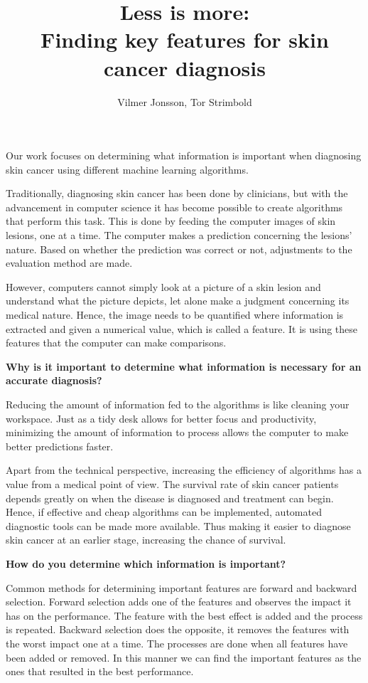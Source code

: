 \documentclass{article}
\author{Vilmer Jonsson, Tor Strimbold}
\title{Less is more: \\ Finding key features for skin cancer diagnosis}
\begin{document}
\thispagestyle{fancy}

\maketitle

\noindent Our work focuses on determining what information is important when diagnosing skin cancer using different machine learning algorithms.

Traditionally, diagnosing skin cancer has been done by clinicians, but with the advancement in computer science it has become possible to create algorithms that perform this task. This is done by feeding the computer images of skin lesions, one at a time. The computer makes a prediction concerning the lesions' nature. Based on whether the prediction was correct or not, adjustments to the evaluation method are made.

However, computers cannot simply look at a picture of a skin lesion and understand what the picture depicts, let alone make a judgment concerning its medical nature. Hence, the image needs to be quantified where information is extracted and given a numerical value, which is called a feature. It is using these features that the computer can make comparisons.
\vspace*{4px}

\noindent\textbf{Why is it important to determine what information is necessary for an accurate diagnosis?}

Reducing the amount of information fed to the algorithms is like cleaning your workspace. Just as a tidy desk allows for better focus and productivity, minimizing the amount of information to process allows the computer to make better predictions faster.

Apart from the technical perspective, increasing the efficiency of algorithms has a value from a medical point of view. The survival rate of skin cancer patients depends greatly on when the disease is diagnosed and treatment can begin. Hence, if effective and cheap algorithms can be implemented, automated diagnostic tools can be made more available. Thus making it easier to diagnose skin cancer at an earlier stage, increasing the chance of survival.
\vspace*{4px}

\noindent\textbf{How do you determine which information is important?}

Common methods for determining important features are forward and backward selection. Forward selection adds one of the features and observes the impact it has on the performance. The feature with the best effect is added and the process is repeated. Backward selection does the opposite, it removes the features with the worst impact one at a time. The processes are done when all features have been added or removed. In this manner we can find the important features as the ones that resulted in the best performance.
\end{document}
